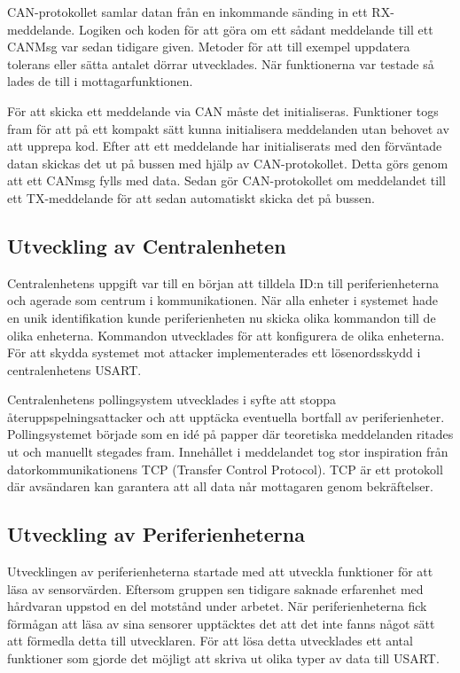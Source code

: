 \documentclass[a4paper]{article}
\begin{document}
CAN-protokollet samlar datan från en inkommande sänding in ett RX-meddelande.
Logiken och koden för att göra om ett sådant meddelande till ett CANMsg var sedan tidigare given.
Metoder för att till exempel uppdatera tolerans eller sätta antalet dörrar utvecklades.
När funktionerna var testade så lades de till i mottagarfunktionen.

För att skicka ett meddelande via CAN måste det initialiseras.
Funktioner togs fram för att på ett kompakt sätt kunna initialisera meddelanden utan behovet av att upprepa kod.
Efter att ett meddelande har initialiserats med den förväntade datan skickas det ut på bussen med hjälp av CAN-protokollet.
Detta görs genom att ett CANmsg fylls med data.
Sedan gör CAN-protokollet om meddelandet till ett TX-meddelande för att sedan automatiskt skicka det på bussen.

\subsection{Utveckling av Centralenheten}
Centralenhetens uppgift var till en början att tilldela ID:n till periferienheterna och agerade som centrum i kommunikationen.
När alla enheter i systemet hade en unik identifikation kunde periferienheten nu skicka olika kommandon till de olika enheterna.
Kommandon utvecklades för att konfigurera de olika enheterna.
För att skydda systemet mot attacker implementerades ett lösenordsskydd i centralenhetens USART.

Centralenhetens pollingsystem utvecklades i syfte att stoppa återuppspelningsattacker och att upptäcka eventuella bortfall av periferienheter.
Pollingsystemet började som en idé på papper där teoretiska meddelanden ritades ut och manuellt stegades fram.
Innehållet i meddelandet tog stor inspiration från datorkommunikationens TCP (Transfer Control Protocol).
TCP är ett protokoll där avsändaren kan garantera att all data når mottagaren genom bekräftelser.

\subsection{Utveckling av Periferienheterna}
Utvecklingen av periferienheterna startade med att utveckla funktioner för att läsa av sensorvärden.
Eftersom gruppen sen tidigare saknade erfarenhet med hårdvaran uppstod en del motstånd under arbetet.
När periferienheterna fick förmågan att läsa av sina sensorer upptäcktes det att det inte fanns något sätt att förmedla detta till utvecklaren.
För att lösa detta utvecklades ett antal funktioner som gjorde det möjligt att skriva ut olika typer av data till USART.
\end{document}
